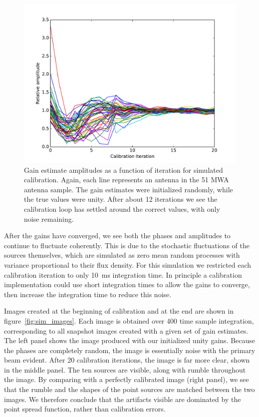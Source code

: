 \documentclass[a4paper,fleqn,usenatbib]{mnras}
\begin{document}
\begin{figure}
\begin{center}
\includegraphics[width=\columnwidth]{fig4.pdf}
\caption{Gain estimate amplitudes as a function of iteration for simulated calibration. Again, 
each line represents an antenna in the 51 MWA antenna sample. The gain estimates were 
initialized randomly, while the true values were unity. After about 12 iterations we see the 
calibration loop has settled around the correct values, with only noise remaining.}
\label{fig:sim_amp}
\end{center}
\end{figure}

After the gains have converged, we see both the phases and amplitudes to continue to 
fluctuate coherently. This is due to the stochastic fluctuations of the sources 
themselves, which are simulated as zero mean random processes with variance proportional
to their flux density.
For this simulation we restricted each calibration 
iteration to only 10~ms integration time. In principle a calibration implementation could use 
short integration times to allow the gains to converge, then increase the integration time to 
reduce this noise.

Images created at the beginning of calibration and at the end are shown in 
figure~\ref{fig:sim_images}. Each image is obtained over 400 time sample integration, corresponding to 
all snapshot images created with a given set of gain estimates. The left panel shows the image 
produced with our initialized unity gains. Because the phases are completely random, the 
image is essentially noise with the primary beam evident. After 20 calibration iterations, the image is far 
more clear, shown in the middle panel. 
The ten sources are visible, along with rumble throughout the image. By comparing with
a perfectly calibrated image (right panel), we see that the rumble and the shapes of the
point sources are matched between the two images. We therefore conclude that the 
artifacts visible are dominated by the point spread function, rather than calibration errors.
\end{document}
